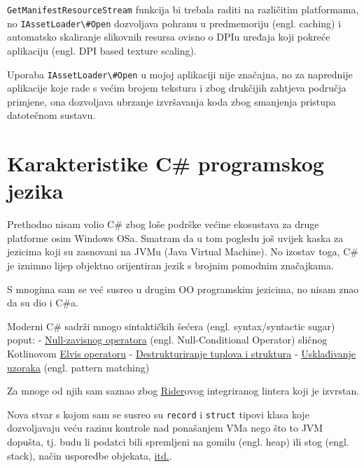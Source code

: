 \documentclass[12pt,a4paper]{report}
\begin{document}
\verb|GetManifestResourceStream| funkcija bi trebala raditi na
različitim platformama, no \verb|IAssetLoader\#Open| dozvoljava
pohranu u predmemoriju (engl. caching) i automatsko skaliranje slikovnih
resursa ovisno o DPIu uređaja koji pokreće aplikaciju (engl. DPI based
texture scaling).

Uporaba \verb|IAssetLoader\#Open| u mojoj aplikaciji nije značajna, no
za naprednije aplikacije koje rade s većim brojem tekstura i zbog
drukčijih zahtjeva područja primjene, ona dozvoljava ubrzanje
izvršavanja koda zbog smanjenja pristupa datotečnom sustavu.

\hypertarget{karakteristike-c-programskog-jezika}{%
\chapter{Karakteristike C\# programskog
jezika}\label{karakteristike-c-programskog-jezika}}

Prethodno nisam volio C\# zbog loše podrške većine ekosustava za druge
platforme osim Windows OSa. Smatram da u tom pogledu još uvijek kaska za
jezicima koji su zasnovani na JVMu (Java Virtual Machine). No izostav
toga, C\# je iznimno lijep objektno orijentiran jezik s brojnim pomodnim
značajkama.

S mnogima sam se već susreo u drugim OO programskim jezicima, no nisam
znao da su dio i C\#a.

Moderni C\# sadrži mnogo sintaktičkih šećera (engl. syntax/syntactic
sugar) poput: -
\href{https://csharp.christiannagel.com/2016/06/17/nullconditionaloperator/}{Null-zavisnog
operatora} (engl. Null-Conditional Operator) sličnog Kotlinovom
\href{https://kotlin-quick-reference.com/156-R-elvis-operator.html}{Elvis
operatoru} -
\href{https://learn.microsoft.com/en-us/dotnet/csharp/fundamentals/functional/deconstruct}{Destrukturiranje
tuplova i struktura} -
\href{https://learn.microsoft.com/en-us/dotnet/csharp/fundamentals/functional/pattern-matching}{Usklađivanje
uzoraka} (engl. pattern matching)

Za mnoge od njih sam saznao zbog
\href{https://www.jetbrains.com/rider/}{Rider}ovog integriranog lintera
koji je izvrstan.

Nova stvar s kojom sam se susreo su \verb|record| i \verb|struct|
tipovi klasa koje dozvoljavaju veću razinu kontrole nad ponašanjem VMa
nego što to JVM dopušta, tj. budu li podatci bili spremljeni na gomilu
(engl. heap) ili stog (engl. stack), način usporedbe objekata,
\href{https://stackoverflow.com/questions/64816714/when-to-use-record-vs-class-vs-struct}{itd.}.
\end{document}
